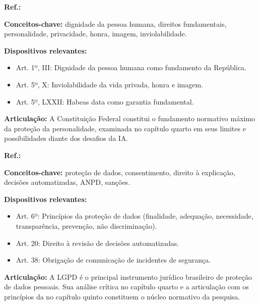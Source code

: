 \begin{fichamento}
    \textbf{Ref.:} \cite{Brasil1988CF}
    
    \textbf{Conceitos-chave:} dignidade da pessoa humana, direitos fundamentais, personalidade, privacidade, honra, imagem, inviolabilidade.
    
    \textbf{Dispositivos relevantes:}
    \begin{itemize}
        \item Art. 1º, III: Dignidade da pessoa humana como fundamento da República.
        \item Art. 5º, X: Inviolabilidade da vida privada, honra e imagem.
        \item Art. 5º, LXXII: Habeas data como garantia fundamental.
    \end{itemize}
    
    \textbf{Articulação:} A Constituição Federal constitui o fundamento normativo máximo da proteção da personalidade, examinada no capítulo quarto em seus limites e possibilidades diante dos desafios da IA.
\end{fichamento}

\begin{fichamento}
    \textbf{Ref.:} \cite{Brasil2018LGPD}
    
    \textbf{Conceitos-chave:} proteção de dados, consentimento, direito à explicação, decisões automatizadas, ANPD, sanções.
    
    \textbf{Dispositivos relevantes:}
    \begin{itemize}
        \item Art. 6º: Princípios da proteção de dados (finalidade, adequação, necessidade, transparência, prevenção, não discriminação).
        \item Art. 20: Direito à revisão de decisões automatizadas.
        \item Art. 38: Obrigação de comunicação de incidentes de segurança.
    \end{itemize}
    
    \textbf{Articulação:} A LGPD é o principal instrumento jurídico brasileiro de proteção de dados pessoais. Sua análise crítica no capítulo quarto e a articulação com os princípios da \MH{} no capítulo quinto constituem o núcleo normativo da pesquisa.
\end{fichamento}

